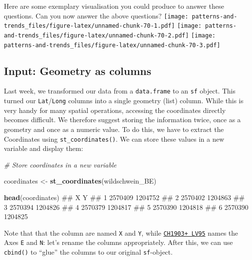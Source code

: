 \documentclass[]{book}
\newenvironment{Shaded}{\begin{snugshade}}{\end{snugshade}}
\newcommand{\KeywordTok}[1]{\textcolor[rgb]{0.13,0.29,0.53}{\textbf{#1}}}
\newcommand{\StringTok}[1]{\textcolor[rgb]{0.31,0.60,0.02}{#1}}
\newcommand{\CommentTok}[1]{\textcolor[rgb]{0.56,0.35,0.01}{\textit{#1}}}
\newcommand{\NormalTok}[1]{#1}
\begin{document}
Here are some exemplary visualisation you could produce to answer these
questions. Can you now answer the above questions?
\texttt{[image: patterns-and-trends\_files/figure-latex/unnamed-chunk-70-1.pdf]}
\texttt{[image: patterns-and-trends\_files/figure-latex/unnamed-chunk-70-2.pdf]}
\texttt{[image: patterns-and-trends\_files/figure-latex/unnamed-chunk-70-3.pdf]}

\subsection{Input: Geometry as columns}\label{input-geometry-as-columns}

Last week, we transformed our data from a \texttt{data.frame} to an
\texttt{sf} object. This turned our \texttt{Lat}/\texttt{Long} columns
into a single geometry (list) column. While this is very handy for many
spatial operations, accessing the coordinates directly becomes
difficult. We therefore suggest storing the information twice, once as a
geometry and once as a numeric value. To do this, we have to extract the
Coordinates using \texttt{st\_coordinates()}. We can store these values
in a new variable and display them:

\begin{Shaded}
\begin{Highlighting}[]
\CommentTok{# Store coordinates in a new variable}

\NormalTok{coordinates <-}\StringTok{ }\KeywordTok{st_coordinates}\NormalTok{(wildschwein_BE)}

\KeywordTok{head}\NormalTok{(coordinates)}
\NormalTok{##         X       Y}
\NormalTok{## 1 2570409 1204752}
\NormalTok{## 2 2570402 1204863}
\NormalTok{## 3 2570394 1204826}
\NormalTok{## 4 2570379 1204817}
\NormalTok{## 5 2570390 1204818}
\NormalTok{## 6 2570390 1204825}
\end{Highlighting}
\end{Shaded}

Note that that the column are named \texttt{X} and \texttt{Y}, while
\href{https://www.swisstopo.admin.ch/de/wissen-fakten/geodaesie-vermessung/neue-koordinaten.html}{\texttt{CH1903+\ LV95}}
names the Axes \texttt{E} and \texttt{N}: let's rename the columns
appropriately. After this, we can use \texttt{cbind()} to ``glue'' the
columns to our original \texttt{sf}-object.
\end{document}

